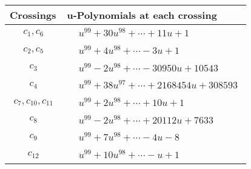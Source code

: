 \documentclass[1p]{elsarticle_modified}
\theoremstyle{definition}
\begin{document}
\begin{tabular}{m{50pt}|m{274pt}}
Crossings & \hspace{64pt}u-Polynomials at each crossing \\
\hline $$\begin{aligned}c_{1},c_{6}\end{aligned}$$&$\begin{aligned}
&u^{99}+30 u^{98}+\cdots+11 u+1
\end{aligned}$\\
\hline $$\begin{aligned}c_{2},c_{5}\end{aligned}$$&$\begin{aligned}
&u^{99}+4 u^{98}+\cdots-3 u+1
\end{aligned}$\\
\hline $$\begin{aligned}c_{3}\end{aligned}$$&$\begin{aligned}
&u^{99}-2 u^{98}+\cdots-30950 u+10543
\end{aligned}$\\
\hline $$\begin{aligned}c_{4}\end{aligned}$$&$\begin{aligned}
&u^{99}+38 u^{97}+\cdots+2168454 u+308593
\end{aligned}$\\
\hline $$\begin{aligned}c_{7},c_{10},c_{11}\end{aligned}$$&$\begin{aligned}
&u^{99}+2 u^{98}+\cdots+10 u+1
\end{aligned}$\\
\hline $$\begin{aligned}c_{8}\end{aligned}$$&$\begin{aligned}
&u^{99}-2 u^{98}+\cdots+20112 u+7633
\end{aligned}$\\
\hline $$\begin{aligned}c_{9}\end{aligned}$$&$\begin{aligned}
&u^{99}+7 u^{98}+\cdots-4 u-8
\end{aligned}$\\
\hline $$\begin{aligned}c_{12}\end{aligned}$$&$\begin{aligned}
&u^{99}+10 u^{98}+\cdots- u+1
\end{aligned}$\\
\hline
\end{tabular}\\~\\
\end{document}
